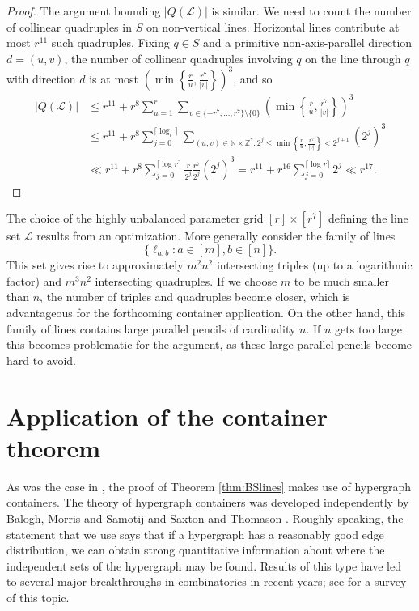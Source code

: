\documentclass[11pt]{amsart}
\newcommand{\cL}{\mathcal{L}}
\theoremstyle{remark}
\begin{document}
\begin{proof}
   The argument bounding $|Q(\cL)|$ is similar. We need to count the number of collinear quadruples in $S$ on non-vertical lines. Horizontal lines contribute at most $r^{11}$ such quadruples. Fixing $q \in S$ and a primitive non-axis-parallel direction $d=(u,v)$, the number of collinear quadruples involving $q$ on the line through $q$ with direction $d$ is at most $\left (\min \left \{ \frac{r}{u}, \frac{r^7}{|v|} \right \} \right )^3$, and so
   \begin{align*}
     |Q(\cL)| &  \leq r^{11}+ r^8 \sum_{u=1}^{r} \sum_{v \in \{-r^7,\dots,r^7\} \setminus \{0\}} \left (\min \left \{ \frac{r}{u}, \frac{r^7}{|v|} \right \} \right )^3 
      \\& \leq r^{11}+ r^8 \sum_{j=0}^{\lceil \log_r \rceil } \sum_{(u,v) \in \mathbb N \times  \mathbb Z^* : 2^j \leq \min \left \{ \frac{r}{u}, \frac{r^7}{|v|} \right \} < 2^{j+1}} (2^j)^3
      \\& \ll r^{11}+  r^8 \sum_{j=0}^{ \lceil \log r \rceil } \frac{r}{2^j} \frac{r^7}{2^j}(2^j)^3
       = r^{11}+  r^{16} \sum_{j=0}^{ \lceil \log r \rceil} 2^j \ll r^{17}.
   \end{align*}
\end{proof}

The choice of the highly unbalanced parameter grid $[r]\times[r^7]$ defining the line set $\cL$ results from an optimization. More generally consider the family of lines
\[
 \{ \ell_{a,b} : a \in [m], b \in [n] \}.
\] 
This set gives rise to approximately $m^2n^2$ intersecting triples (up to a logarithmic factor) and $m^3n^2$ intersecting quadruples. If we choose $m$ to be much smaller than $n$, the number of triples and quadruples become closer, which is advantageous for the forthcoming container application. On the other hand, this family of lines contains large parallel pencils of cardinality $n$. If $n$ gets too large this becomes problematic for the argument, as these large parallel pencils become hard to avoid.

\section{Application of the container theorem}

As was the case in \cite{BaSo}, the proof of Theorem \ref{thm:BSlines} makes use of hypergraph containers. The theory of hypergraph containers was developed independently by Balogh, Morris and Samotij \cite{BMS} and Saxton and Thomason \cite{SaTh}. Roughly speaking, the statement that we use says that if a hypergraph has a reasonably good edge distribution, we can obtain strong quantitative information about where the independent sets of the hypergraph may be found. Results of this type have led to several major breakthroughs in combinatorics in recent years; see \cite{BMS2} for a survey of this topic. 
\end{document}
